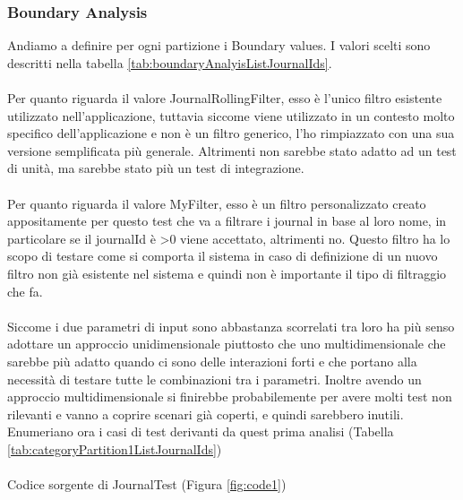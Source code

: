 \documentclass[12pt, a4paper]{article}
\begin{document}
\subsubsection{Boundary Analysis}
Andiamo a definire per ogni partizione i Boundary values. I valori scelti sono 
descritti nella tabella \ref{tab:boundaryAnalyisListJournalIds}. \\ \\
Per quanto riguarda il valore JournalRollingFilter, esso è l'unico filtro esistente utilizzato nell'applicazione, 
tuttavia siccome viene utilizzato in un contesto molto specifico dell'applicazione e non è un filtro generico, l'ho rimpiazzato
con una sua versione semplificata più generale. Altrimenti non sarebbe stato adatto ad un test di unità, ma sarebbe stato 
più un test di integrazione. \\ \\
Per quanto riguarda il valore MyFilter, esso è un filtro personalizzato creato appositamente per questo test che va a filtrare i journal
in base al loro nome, in particolare se il journalId è \textgreater 0 viene accettato, altrimenti no. 
Questo filtro ha lo scopo di testare come si comporta il sistema in caso di definizione di un nuovo filtro non già esistente 
nel sistema e quindi non è importante il tipo di filtraggio che fa. \\ \\
Siccome i due parametri di input sono abbastanza scorrelati tra loro ha più senso adottare un approccio 
unidimensionale piuttosto che uno multidimensionale che sarebbe più adatto quando ci sono delle interazioni forti
e che portano alla necessità di testare tutte le combinazioni tra i parametri. Inoltre avendo un approccio multidimensionale
si finirebbe probabilemente per avere molti test non rilevanti e vanno a coprire scenari già coperti, e quindi sarebbero inutili.
\\ Enumeriano ora i casi di test derivanti da quest prima analisi (Tabella \ref{tab:categoryPartition1ListJournalIds}) \\ \\
Codice sorgente di JournalTest (Figura \ref{fig:code1})
\end{document}
